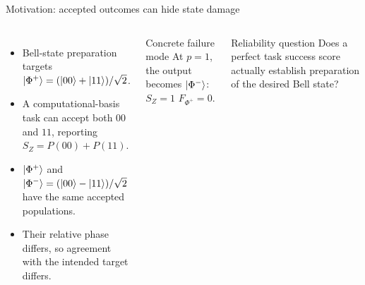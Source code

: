 \documentclass[10pt,aspectratio=169]{beamer}
\newcommand{\sourcefoot}[1]{}
\begin{document}
\begin{frame}[t]{Motivation: accepted outcomes can hide state damage}
\begin{columns}[T]
\begin{itemize}
  \item Bell-state preparation targets $\ket{\Phi^+}=(\ket{00}+\ket{11})/\sqrt{2}$.
  \item A computational-basis task can accept both $00$ and $11$, reporting $S_Z=P(00)+P(11)$.
  \item $\ket{\Phi^+}$ and $\ket{\Phi^-}=(\ket{00}-\ket{11})/\sqrt{2}$ have the same accepted populations.
  \item Their relative phase differs, so agreement with the intended target differs.
\end{itemize}
\begin{block}{Concrete failure mode}
At $p=1$, the output becomes $\ket{\Phi^-}$:\\[1mm]
\centering $S_Z=1$ \qquad $F_{\Phi^+}=0$.
\end{block}
\begin{alertblock}{Reliability question}
Does a perfect task success score actually establish preparation of the desired Bell state?
\end{alertblock}
\end{columns}
\sourcefoot{Analytic setup in \texttt{paper/main.tex}, Introduction and Methodology.}
\end{frame}
\end{document}
